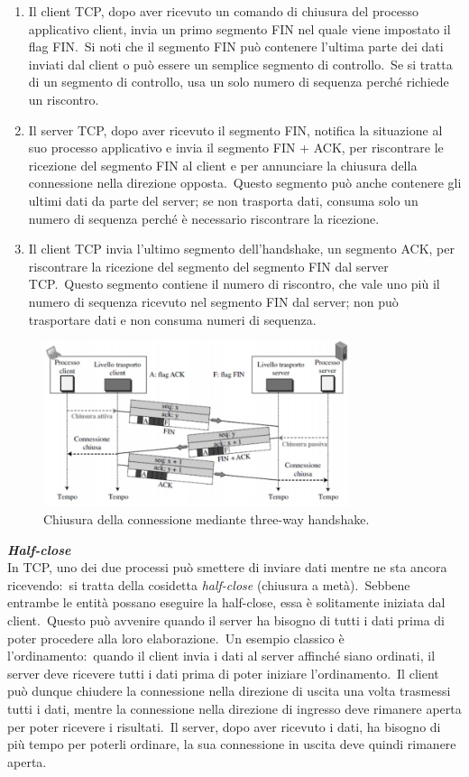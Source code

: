 \begin{enumerate}
    \item Il client TCP, dopo aver ricevuto un comando di chiusura del processo applicativo client, invia un primo segmento FIN nel quale viene impostato il flag FIN.\
          Si noti che il segmento FIN può contenere l'ultima parte dei dati inviati dal client o può essere un semplice segmento di controllo.\
          Se si tratta di un segmento di controllo, usa un solo numero di sequenza perché richiede un riscontro.
    \item Il server TCP, dopo aver ricevuto il segmento FIN, notifica la situazione al suo processo applicativo e invia il segmento FIN + ACK, per riscontrare le ricezione del segmento FIN al client e per annunciare la chiusura della connessione nella direzione opposta.\
          Questo segmento può anche contenere gli ultimi dati da parte del server; se non trasporta dati, consuma solo un numero di sequenza perché è necessario riscontrare la ricezione.
    \item Il client TCP invia l'ultimo segmento dell'handshake, un segmento ACK, per riscontrare la ricezione del segmento del segmento FIN dal server TCP.\
          Questo segmento contiene il numero di riscontro, che vale uno più il numero di sequenza ricevuto nel segmento FIN dal server; non può trasportare dati e non consuma numeri di sequenza.
\end{enumerate}
\begin{figure}[H]
    \centering
    \includegraphics[width=0.8\textwidth]{immagini/3_way_close.png}
    \caption*{Chiusura della connessione mediante three-way handshake.}
\end{figure}
\textbf{\emph{Half-close}}\\
In TCP, uno dei due processi può smettere di inviare dati mentre ne sta ancora ricevendo:\ si tratta della cosidetta \emph{half-close} (chiusura a metà).\
Sebbene entrambe le entità possano eseguire la half-close, essa è solitamente iniziata dal client.\
Questo può avvenire quando il server ha bisogno di tutti i dati prima di poter procedere alla loro elaborazione.\
Un esempio classico è l'ordinamento:\ quando il client invia i dati al server affinché siano ordinati, il server deve ricevere tutti i dati prima di poter iniziare l'ordinamento.\
Il client può dunque chiudere la connessione nella direzione di uscita una volta trasmessi tutti i dati, mentre la connessione nella direzione di ingresso deve rimanere aperta per poter ricevere i risultati.\
Il server, dopo aver ricevuto i dati, ha bisogno di più tempo per poterli ordinare, la sua connessione in uscita deve quindi rimanere aperta.

